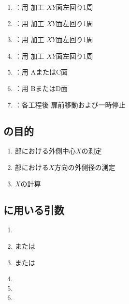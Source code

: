 \begin{enumerate}[label*=\sarrow]
\item \KOLeftFF：\KEndFaceBoring 用 加工 $XY$面左回り1周
\item \KOLeftFS：\KEndFaceRight\KOutcutRLeft\KKeywayConerLeft\KEndFaceOutCChamferRLeft 用 加工 $XY$面左回り1周
\item \KOLeftFSZ：\KCurvedOutcutRLeft\KEndFaceCurvedOutCChamferRLeft 用 加工 $XY$面左回り1周
\item \KILeftFF：\KEndFaceInCChamferRLeft\KIncutBoring 用 加工 $XY$面左回り1周
\item \DKLthreeAC：\DLtwoAC 用 AまたはC面 \DimpleMilling
\item \DKLthreeBD：\DLtwoBD 用 BまたはD面 \DimpleMilling
\item \OpauseCheck：各工程後 扉前移動および一時停止
\end{enumerate}



\clearpage


\subsection{\MXOThickness の目的}
\begin{enumerate}[label*=\sarrow]
\item \EndFace 部における外側中心$X$の測定
\item \EndFace 部における$X$方向の外側径の測定
\item \KeywayCenter$X$の計算
\end{enumerate}


\subsection{\MXOThickness に用いる引数}
\begin{enumerate}[label*=\sarrow]
\item \PMACOD
\item \PMTopReAlocationLength または\PMBottomReAlocationLength
\item \PMTopAlocationLength または\PMBottomAlocationLength
\item \PMCenterCurvatureRadius
\item \PMKeywayPos
\item \PMKeywayWidth
\end{enumerate}


